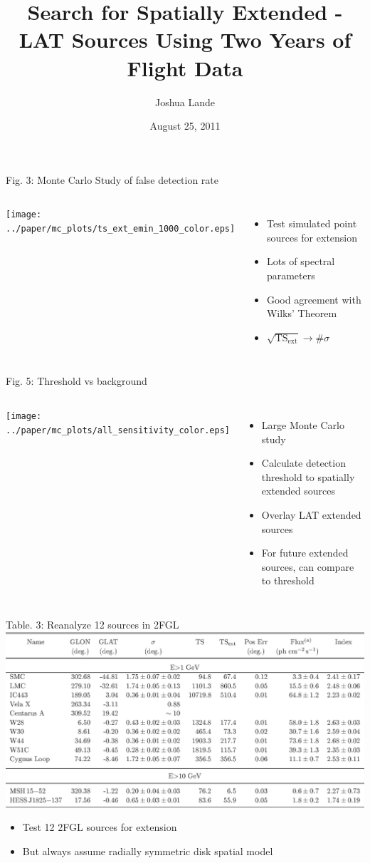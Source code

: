 \documentclass[12pt]{beamer}
\title{Search for Spatially Extended \fermi-LAT Sources Using Two Years of Flight
Data}
\author{Joshua Lande}
\institute{SLAC/Stanford}
\date{August 25, 2011}
\begin{document}


\begin{frame}{Fig. 3: Monte Carlo Study of false detection rate}
  \begin{columns}
    \texttt{[image: ../paper/mc\_plots/ts\_ext\_emin\_1000\_color.eps]}
    \begin{itemize}
      \item Test simulated point sources for extension
      \item Lots of spectral parameters
      \item Good agreement with Wilks' Theorem
      \item $\sqrt{\text{TS}_\text{ext}} \rightarrow \# \sigma$
    \end{itemize}
  \end{columns}
\end{frame}



\begin{frame}{Fig. 5: Threshold vs background}
  \begin{columns}
    \texttt{[image: ../paper/mc\_plots/all\_sensitivity\_color.eps]}
    \begin{itemize}
      \item Large Monte Carlo study
      \item Calculate detection threshold
        to spatially extended sources
      \item Overlay LAT extended sources
      \item For future extended sources, can compare to
        threshold
    \end{itemize}
  \end{columns}
\end{frame}

\begin{frame}{Table. 3: Reanalyze 12 sources in 2FGL}
    \includegraphics[scale=0.5]{tables/table3.eps}
  \begin{itemize}
    \item Test 12 2FGL sources for extension
    \item But always assume radially symmetric disk spatial model
  \end{itemize}
\end{frame}
\end{document}
